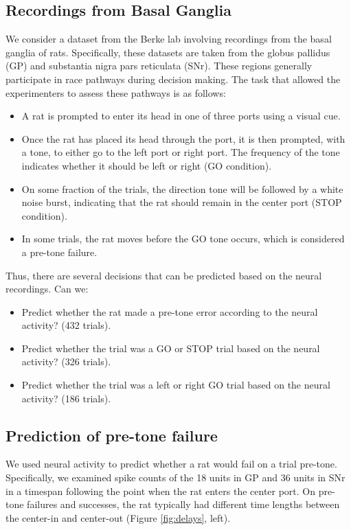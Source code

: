 \documentclass[11pt]{article}
\begin{document}
\subsection{Recordings from Basal Ganglia}
We consider a dataset from the Berke lab involving recordings from the basal ganglia of rats. Specifically, these datasets are taken from the  globus pallidus (GP) and substantia nigra pars reticulata (SNr). These regions generally participate in race pathways during decision making. The task that allowed the experimenters to assess these pathways is as follows:
\begin{itemize}
	\item A rat is prompted to enter its head in one of three ports using a visual cue. 
	\item Once the rat has placed its head through the port, it is then prompted, with a tone, to either go to the left port or right port. The frequency of the tone indicates whether it should be left or right (GO condition).
	\item On some fraction of the trials, the direction tone will be followed by a white noise burst, indicating that the rat should remain in the center port (STOP condition).
	\item In some trials, the rat moves before the GO tone occurs, which is considered a pre-tone failure.
\end{itemize}
Thus, there are several decisions that can be predicted based on the neural recordings. Can we:
\begin{itemize}
	\item Predict whether the rat made a pre-tone error according to the neural activity? (432 trials).
	\item Predict whether the trial was a GO or STOP trial based on the neural activity? (326 trials).
	\item Predict whether the trial was a left or right GO trial based on the neural activity? (186 trials).
\end{itemize}

\subsection{Prediction of pre-tone failure}
We used neural activity to predict whether a rat would fail on a trial pre-tone. Specifically, we examined spike counts of the 18 units in GP  and 36 units in SNr in a timespan following the point when the rat enters the center port. On pre-tone failures and successes, the rat typically had different time lengths between the center-in and center-out (Figure \ref{fig:delays}, left). 
\end{document}
